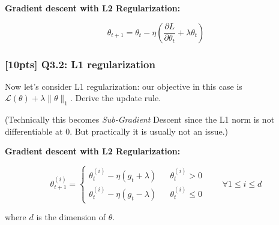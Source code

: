 \documentclass[11pt]{article}
\begin{document}
    \textbf{Gradient descent with L2 Regularization:}

\[ \theta_{t+1} = \theta_{t} - \eta (\frac{\partial L}{\partial \theta_t } + \lambda \theta_t)\]

    \hypertarget{pts-q3.2-l1-regularization}{%
\subsubsection{{[}10pts{]} Q3.2: L1
regularization}\label{pts-q3.2-l1-regularization}}

Now let's consider L1 regularization: our objective in this case is
\(\mathcal{L}(\theta) + \lambda \|\theta\|_1\). Derive the update rule.

(Technically this becomes \emph{Sub-Gradient} Descent since the L1 norm
is not differentiable at 0. But practically it is usually not an issue.)

    \textbf{Gradient descent with L2 Regularization:}

\[ \theta_{t+1}^{(i)}=\left\{
\begin{array}{rcl}
\theta_t^{(i)}-\eta (g_t+\lambda)     &      & {\theta_t^{(i)} > 0}\\
\theta_t^{(i)}-\eta (g_t-\lambda)       &      & {\theta_t^{(i)} \leq 0}
\end{array} \right. \quad\quad\forall 1\leq i\leq d\]

where \(d\) is the dimension of \(\theta\).


    
    
    
\end{document}
